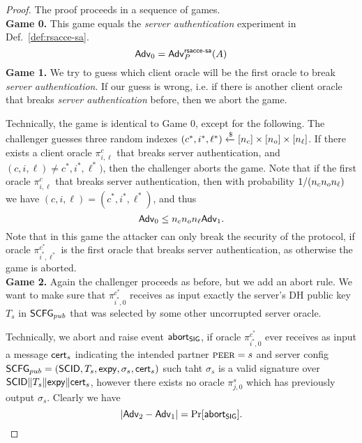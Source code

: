 \begin{proof}
 The proof proceeds in a sequence of games. \vspace{10pt}\\
 {\bfseries Game 0.} This game equals the \textit{server authentication} experiment in Def.~\ref{def:rsacce-sa}.\\
 \begin{equation}
  \mathsf{Adv}_0 = \mathsf{Adv}^{\mathsf{rsacce\textsc{-} sa}}_{P}(A)
 \end{equation}%
%
%
 \textbf{Game 1.} We try to guess which client oracle will be the first oracle to break \textit{server authentication}. If our guess is wrong, i.e. if there is another client oracle that breaks \textit{server authentication} before, then we abort the game.

 Technically, the game is identical to Game 0, except for the following. The challenger guesses three random indexes $(c^{\ast}, i^{\ast}, \ell^{\ast}) \xleftarrow{\$} [n_c] \times [n_o] \times [n_{\ell}]$. If there exists a client oracle $\pi^c_{i,\ell}$ that breaks server authentication, and $(c, i, \ell) \neq c^{\ast}, i^{\ast}, \ell^{\ast})$, then the challenger aborts the game. Note that if the first oracle $\pi^c_{i,\ell}$ that breaks server authentication, then with probability $1/(n_c n_o n_{\ell})$ we have $(c,i,\ell) = (c^{\ast}, i^{\ast}, \ell^{\ast})$, and thus
 \begin{equation}
  \mathsf{Adv}_0 \leq n_c n_o n_{\ell} \mathsf{Adv}_1.
 \end{equation}%
 Note that in this game the attacker can only break the security of the protocol, if oracle $\pi^{c^{\ast}}_{i^{\ast},\ell^{\ast}}$ is the first oracle that breaks server authentication, as otherwise the game is aborted.
\vspace{10pt}\\%
%
%
 \textbf{Game 2.} Again the challenger proceeds as before, but we add an abort rule. We want to make sure that $\pi^{c^\ast}_{i^{\ast},0}$ receives as input exactly the server's DH public key $T_s$ in $\mathsf{SCFG}_{pub}$ that was selected by some other uncorrupted server oracle.

 Technically, we abort and raise event $\mathsf{abort}_{\mathsf{SIG}}$, if oracle $\pi^{c^{\ast}}_{i^{\ast},0}$ ever receives as input a message $\mathsf{cert}_s$ indicating the intended partner $\textsc{peer} = s$ and server config $\mathsf{SCFG}_{pub} = (\mathsf{SCID}, T_s, \mathsf{expy}, \sigma_s, \mathsf{cert}_s)$ such taht $\sigma_s$ is a valid signature over $\mathsf{SCID} \| T_s \| \mathsf{expy} \| \mathsf{cert}_s$, however there exists no oracle $\pi^s_{j,0}$ which has previously output $\sigma_s$. Clearly we have
 \begin{equation}
  |\mathsf{Adv}_2 - \mathsf{Adv}_1| = \Pr[\mathsf{abort}_{\mathsf{SIG}}].
 \end{equation}%


\end{proof}

